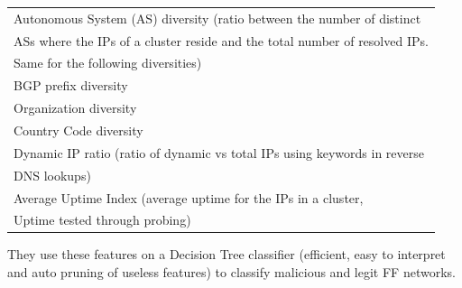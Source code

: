 \begin{tabular}{|l|}
\hline
Autonomous System (AS) diversity (ratio between the number of distinct\\ ASs where the IPs of a cluster reside and the total number of resolved IPs. \\Same for the following diversities)\\
\hline
BGP prefix diversity\\
\hline
Organization diversity\\
\hline
Country Code diversity\\
\hline
Dynamic IP ratio (ratio of dynamic vs total IPs using keywords in reverse\\ DNS lookups)\\
\hline
Average Uptime Index (average uptime for the IPs in a cluster,\\ Uptime tested through probing)\\
\hline
\end{tabular}

They use these features on a Decision Tree classifier (efficient, easy to interpret and auto pruning of useless features) to classify malicious and legit FF networks.\\

